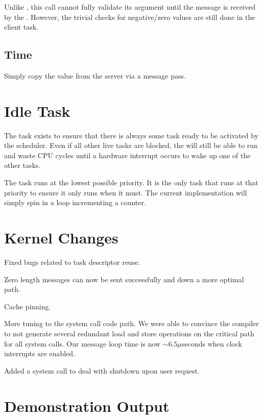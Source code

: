 \documentclass[pdftex,10pt,a4paper]{article}
\begin{document}
Unlike , this call cannot fully validate its argument until
the message is received by the . However, the
trivial checks for negative/zero values are still done in the client
task.

\subsection*{Time}

Simply copy the value from the server via a message pass.

\section*{Idle Task}

The  task exists to ensure that there is always some task
ready to be activated by the scheduler. Even if all other live tasks
are blocked, the  will still be able to run and waste CPU
cycles until a hardware interrupt occurs to wake up one of the other
tasks.

The  task runs at the lowest possible priority. It is the
only task that runs at that priority to ensure it only runs when it
must. The current implementation will simply spin in a 
loop incrementing a counter.


\section*{Kernel Changes}

Fixed bugs related to task descriptor reuse.

Zero length messages can now be sent successfully and down a more
optimal path.

Cache pinning.

More tuning to the system call code path. We were able to convince the
compiler to not generate several redundant load and store operations on
the critical path for all system calls. Our message loop time is now
$\sim6.5\mu$seconds when clock interrupts are enabled.

Added a  system call to deal with shutdown upon user
request.

\newpage
\section*{Demonstration Output}

\end{document}

